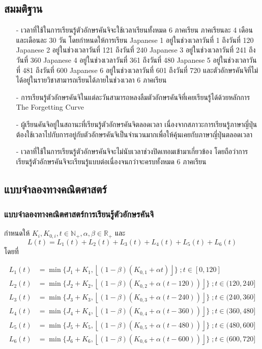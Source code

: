 \documentclass{article}
\begin{document}
\subsection{สมมติฐาน}
\begin{itemize}
	\item[-] เวลาที่ใช้ในการเรียนรู้ตัวอักษรคันจิจะใช้เวลาเรียนทั้งหมด 6 ภาคเรียน ภาคเรียนละ 4 เดือน และเดือนละ 30 วัน โดยกำหนดให้การเรียน Japanese 1 อยู่ในช่วงเวลาวันที่ 1 ถึงวันที่ 120 Japanese 2 อยู่ในช่วงเวลาวันที่ 121 ถึงวันที่ 240 Japanese 3 อยู่ในช่วงเวลาวันที่ 241 ถึงวันที่ 360 Japanese 4 อยู่ในช่วงเวลาวันที่ 361 ถึงวันที่ 480 Japanese 5 อยู่ในช่วงเวลาวันที่ 481 ถึงวันที่ 600 Japanese 6 อยู่ในช่วงเวลาวันที่ 601 ถึงวันที่ 720 และตัวอักษรคันจิที่ไม่ได้อยู่ในรายวิชาสามารถเรียนได้ภายในช่วงเวลา 6 ภาคเรียน
	\item[-] การเรียนรู้ตัวอักษรคันจิในแต่ละวันสามารถหลงลืมตัวอักษรคันจิที่เคยเรียนรู้ได้ด้วยหลักการ The Forgetting Curve\cite{ebbinghaus1913memory} 
	\item[-] ผู้เรียนคันจิอยู่ในสถานะที่เรียนรู้ตัวอักษรคันจิตลอดเวลา เนื่องจากสภาวะการเรียนรู้ภาษาญี่ปุ่นต้องใช้เวลาไปกับการอยู่กับตัวอักษรคันจิเป็นจำนวนมากเพื่อให้คุ้นเคยกับภาษาญี่ปุ่นตลอดเวลา
	\item[-] เวลาที่ใช้ในการเรียนรู้ตัวอักษรคันจิจะไม่นับเวลาช่วงปิดเทอมเข้ามาเกี่ยวข้อง โดยถือว่าการเรียนรู้ตัวอักษรคันจิจะเรียนรู้แบบต่อเนื่องจนกว่าจะครบทั้งหมด 6 ภาคเรียน
	\end{itemize}
\subsection{แบบจำลองทางคณิตศาสตร์}
\subsubsection{แบบจำลองทางคณิตศาสตร์การเรียนรู้ตัวอักษรคันจิ}
กำหนดให้ $ K_i , K_{0,i} , t \in \mathbb{N}_+ , \alpha , \beta \in \mathbb{R}_+ $ และ 
$$ L(t) = L_1(t) + L_2(t) + L_3(t) + L_4(t) + L_5(t) + L_6(t) $$
โดยที่
\begin{center}
\begin{align*}
L_1(t) & = \min \{J_1 + K_1, \left\lfloor (1 - \beta)(K_{0,1} + \alpha{t}) \right\rfloor\} \; ; t \in [0,120] \\
L_2(t) & = \min \{J_2 + K_2, \left\lfloor (1 - \beta)(K_{0,2} + \alpha{(t - 120)}) \right\rfloor\} \; ; t \in (120,240] \\
L_3(t) & = \min \{J_3 + K_3, \left\lfloor (1 - \beta)(K_{0,3} + \alpha{(t - 240)}) \right\rfloor\} \; ; t \in (240,360] \\
L_4(t) & = \min \{J_4 + K_4, \left\lfloor (1 - \beta)(K_{0,4} + \alpha{(t - 360)}) \right\rfloor\} \; ; t \in (360,480] \\
L_5(t) & = \min \{J_5 + K_5, \left\lfloor (1 - \beta)(K_{0,5} + \alpha{(t - 480)}) \right\rfloor\} \; ; t \in (480,600] \\
L_6(t) & = \min \{J_6 + K_6, \left\lfloor (1 - \beta)(K_{0,6} + \alpha{(t - 600)}) \right\rfloor\} \; ; t \in (600,720] 
\end{align*}
\end{center}
\end{document}

